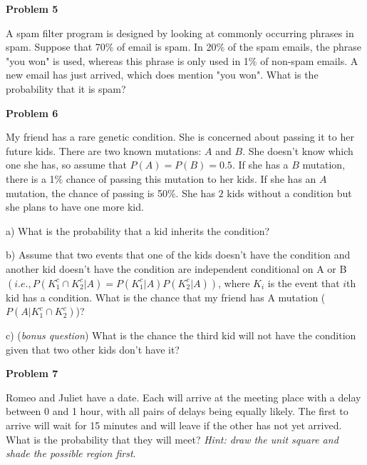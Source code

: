 \documentclass[12pt]{article}
\begin{document}
\begin{flushleft}
\par
\textbf{Problem 5}
\par
\setlength{\parskip}{1em}
\par
A spam filter program is designed by looking at commonly occurring phrases in spam. Suppose that 70\% of email is spam. In 20\% of the spam emails, the phrase "you won" is used, whereas this phrase is only used in 1\% of non-spam emails. A new email has just arrived, which does mention "you won". What is the probability that it is spam? 
\par
\hfill\vspace{0.3in} 
\par

\newpage
\textbf{Problem 6}
\par
\setlength{\parskip}{1em}
\par
My friend has a rare genetic condition. She is concerned about passing it to her future kids. There are two known mutations: $A$ and $B$. She doesn't know which one she has, so assume that $P(A)=P(B)=0.5$. If she has a $B$ mutation, there is a 1\% chance of passing this mutation to her kids. If she has an $A$ mutation, the chance of passing is 50\%. She has $2$ kids without a condition but she plans to have one more kid. 
\par
	a) What is the probability that a kid inherits the condition?
\par
\hfill\vspace{0.7in} 
\par
	b) Assume that two events that one of the kids doesn't have the condition and another kid doesn't have the condition are independent conditional on A or B $(i.e., P(K_1^c\cap K_2^c|A) = P(K_1^c|A)P(K_2^c|A))$, where $K_i$ is the event that $i$th kid has a condition. What is the chance that my friend has A mutation ($P(A|K_1^c\cap K_2^c)$)? 
\par
\hfill\vspace{1in} 
\par
	c) (\textit{bonus question}) What is the chance the third kid will not have the condition given that two other kids don't have it?
\par
\hfill\vspace{1in} 
\par
	
\par
\setlength{\parskip}{1em}
\par
\textbf{Problem 7}
\par
\setlength{\parskip}{1em}
\par
Romeo and Juliet have a date. Each will arrive at the meeting place with a delay between 0 and 1 hour, with all pairs of delays being equally likely. The first to arrive will wait for 15 minutes and will leave if the other has not yet arrived. What is the probability that they will meet? \textit{Hint: draw the unit square and shade the possible region first}.
\par
\hfill\vspace{0.3in} 
\par





\end{flushleft}
\end{document}
